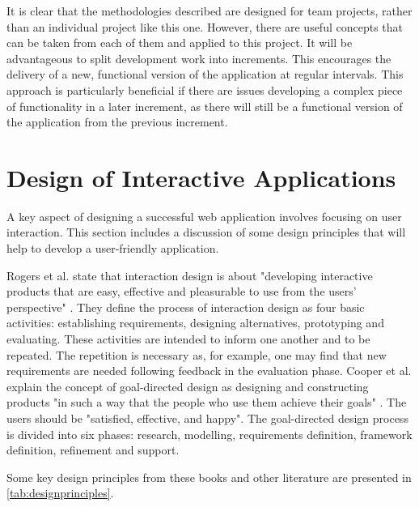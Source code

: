 \documentclass[authoryearcitations]{UoYCSproject}
\begin{document}
It is clear that the methodologies described are designed for team projects, rather than an individual project like this one. However, there are useful concepts that can be taken from each of them and applied to this project. It will be advantageous to split development work into increments. This encourages the delivery of a new, functional version of the application at regular intervals. This approach is particularly beneficial if there are issues developing a complex piece of functionality in a later increment, as there will still be a functional version of the application from the previous increment. 


\section{Design of Interactive Applications}

A key aspect of designing a successful web application involves focusing on user interaction. This section includes a discussion of some design principles that will help to develop a user-friendly application. 

Rogers et al. state that interaction design is about "developing interactive products that are easy, effective and pleasurable to use from the users' perspective" \citep{Rogers2011}. They define the process of interaction design as four basic activities: establishing requirements, designing alternatives, prototyping and evaluating. These activities are intended to inform one another and to be repeated. The repetition is necessary as, for example, one may find that new requirements are needed following feedback in the evaluation phase. Cooper et al. explain the concept of goal-directed design as designing and constructing products "in such a way that the people who use them achieve their goals" \citep{Cooper2007}. The users should be "satisfied, effective, and happy". The goal-directed design process is divided into six phases: research, modelling, requirements definition, framework definition, refinement and support. 

Some key design principles from these books and other literature are presented in \autoref{tab:designprinciples}.
\end{document}
